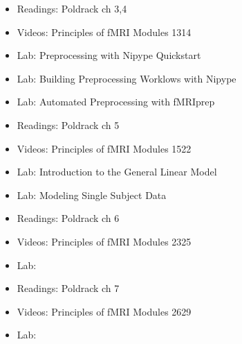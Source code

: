 \documentclass[letterpaper,10pt,english]{sphinxmanual}
\begin{document}
\begin{itemize}
\item {} 
Readings: Poldrack ch 3,4

\item {} 
Videos: Principles of fMRI Modules 13\sphinxhyphen{}14

\item {} 
Lab: Preprocessing with Nipype Quickstart

\item {} 
Lab: Building Preprocessing Worklows with Nipype

\item {} 
Lab: Automated Preprocessing with fMRIprep

\end{itemize}

\begin{itemize}
\item {} 
Readings: Poldrack ch 5

\item {} 
Videos: Principles of fMRI Modules 15\sphinxhyphen{}22

\item {} 
Lab: Introduction to the General Linear Model

\item {} 
Lab: Modeling Single Subject Data

\end{itemize}

\begin{itemize}
\item {} 
Readings: Poldrack ch 6

\item {} 
Videos: Principles of fMRI Modules 23\sphinxhyphen{}25

\item {} 
Lab:

\end{itemize}

\begin{itemize}
\item {} 
Readings: Poldrack ch 7

\item {} 
Videos: Principles of fMRI Modules 26\sphinxhyphen{}29

\item {} 
Lab:

\end{itemize}
\end{document}
